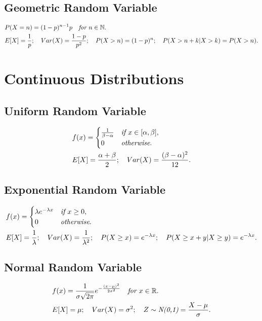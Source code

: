 \documentclass{article}
\begin{document}
\subsection{Geometric Random Variable}
\begin{align*}
    & P(X=n) = (1-p)^{n-1}p \quad \emph{for } n \in \mathbb{N}. \\
    & E[X] = \frac{1}{p}; \quad Var(X) = \frac{1-p}{p^2}; \quad P(X > n) = (1-p)^n ; \quad P(X>n+k|X>k) = P(X>n).
\end{align*}

\newpage
\section{Continuous Distributions}
\subsection{Uniform Random Variable}
\begin{align*}
    & f(x) = \begin{cases}
        \frac{1}{\beta-\alpha} & \emph{if $x \in [\alpha, \beta]$}, \\
        0 & \emph{otherwise}.
    \end{cases} \\
    & E[X] = \frac{\alpha+\beta}{2}; \quad Var(X) = \frac{(\beta-\alpha)^2}{12}.
\end{align*}

\subsection{Exponential Random Variable}
\begin{align*}
    & f(x) = \begin{cases}
        \lambda e^{-\lambda x} & \emph{if $x \ge 0$}, \\
        0 & \emph{otherwise}.
    \end{cases} \\
    & E[X] = \frac{1}{\lambda}; \quad Var(X) = \frac{1}{\lambda^2}; \quad P(X\ge x) = e^{-\lambda x}; \quad P(X\ge x + y|X\ge y) = e^{-\lambda x}.
\end{align*}

\subsection{Normal Random Variable}
\begin{align*}
    & f(x) = \frac{1}{\sigma\sqrt{2\pi}} e^{-\frac{(x-\mu)^2}{2\sigma^2}} \quad \emph{for $x\in \mathbb{R}$}. \\
    & E[X] = \mu; \quad Var(X) = \sigma^2; \quad Z \sim \emph{N(0,1)} = \frac{X-\mu}{\sigma}.
\end{align*}
\end{document}
